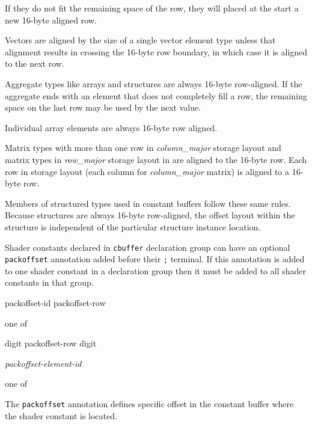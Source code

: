 \p If they do not fit the remaining space of the row, they will placed at the
start a new 16-byte aligned row.

\p Vectors are aligned by the size of a single vector element type unless that
alignment results in crossing the 16-byte row boundary, in which case it is
aligned to the next row.

\p Aggregate types like arrays and structures are always 16-byte row-aligned. If
the aggregate ends with an element that does not completely fill a row, the
remaining space on the last row may be used by the next value.

\p Individual array elements are always 16-byte row aligned.

\p Matrix types with more than one row in \textit{column\_major} storage layout
and matrix types in \textit{row\_major} storage layout in are aligned to the
16-byte row. Each row in storage layout (each column for \textit{column\_major}
matrix) is aligned to a 16-byte row.

\p Members of structured types used in constant buffers follow these same rules.
Because structures are always 16-byte row-aligned, the offset layout within the
structure is independent of the particular structure instance location.


\p Shader constants declared in \texttt{cbuffer} declaration group can have an
optional \texttt{packoffset} annotation added before their \texttt{;} terminal.
If this annotation is added to one shader constant in a declaration group then
it must be added to all shader constants in that group.

\begin{grammar}
  \br
   packoffset-id packoffset-row  \terminal{)}

  \textnormal{one of}\br

  \br
  digit\br
  packoffset-row digit

  \br
   \textit{packoffset-element-id}

  \textnormal{one of}\br
  \br
\end{grammar}

\p The \texttt{packoffset} annotation defines specific offset in the constant
buffer where the shader constant is located.

